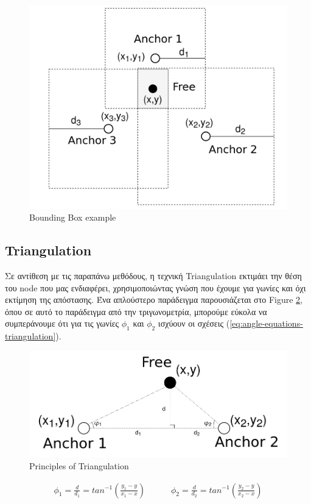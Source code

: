 \begin{figure} [H]
	\centering
	\includegraphics[width=0.5\linewidth]{../Photos/Bounding-box.png}
	\decoRule
	\caption[Bounding Box example]{Bounding Box example}
	\label{fig:Bounding-Box-example}
\end{figure}

\subsection{Triangulation}
Σε αντίθεση με τις παραπάνω μεθόδους, η τεχνική Triangulation εκτιμάει την θέση του node που μας ενδιαφέρει, χρησιμοποιώντας   
γνώση που έχουμε για γωνίες και όχι εκτίμηση της απόστασης. Ένα απλούστερο παράδειγμα παρουσιάζεται στο Figure 
\ref{fig:Principles-of-Triangulation}, όπου σε αυτό το παράδειγμα από την τριγωνομετρία,
μπορούμε εύκολα να συμπεράνουμε ότι για τις γωνίες $\phi_1$ και $\phi_2$ ισχύουν οι σχέσεις (\ref{eq:angle-equations-triangulation}).

\begin{figure} [H]
	\centering
	\includegraphics[width=0.5\linewidth]{../Photos/Tringulation-principle.png}
	\decoRule
	\caption[Principles of Triangulation]{Principles of Triangulation}
	\label{fig:Principles-of-Triangulation}
\end{figure}

\begin{align}
	\phi_1 = \frac{d}{d_1} = tan^{-1}\left(\frac{y_1-y}{x_1-x}\right) \quad \quad \quad
	\phi_2 = \frac{d}{d_2} = tan^{-1}\left(\frac{y_2-y}{x_2-x}\right) \label{eq:angle-equations-triangulation}
\end{align}

